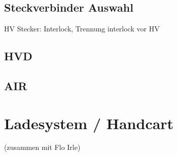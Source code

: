 \subsection{Steckverbinder Auswahl}
HV Stecker: Interlock, Trennung interlock vor HV

\subsection{HVD}

\subsection{AIR}

\section{Ladesystem / Handcart} (zusammen mit Flo Irle)

